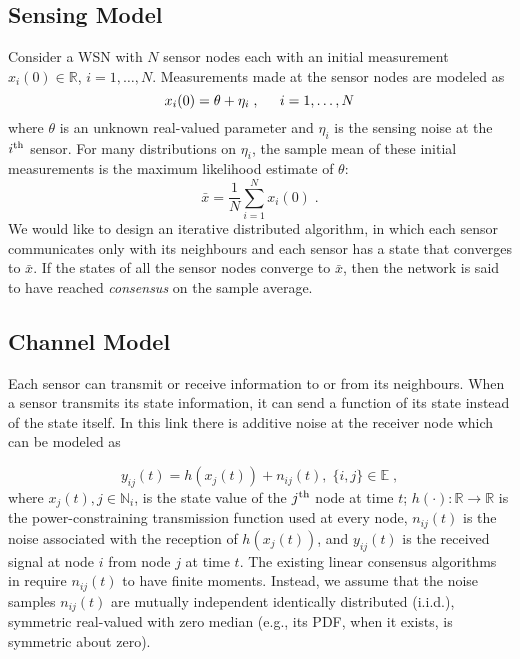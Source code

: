 \documentclass[onecolumn, draft, 12pt]{IEEEtran}
\newcommand{\Ni}{\mathbb{N}_{i}}
\newcommand{\R}{\mathbb{R}}
\newcommand{\xbar}{\bar{x}}
\begin{document}
\subsection{Sensing Model}\label{subsec:nld_sys_model_robust}
Consider a WSN with $N$ sensor nodes each with an initial measurement $x_i(0) \in \R$, $i = 1, \ldots, N$. Measurements made at the sensor nodes are modeled as
\begin{equation}\label{eqn:sensing_model_consensus_robust} x_i (0) = \theta + \eta_i  \;, \hspace{0.2 in} i = 1, \ldots, N
\end{equation}
where $\theta$ is an unknown real-valued parameter and $\eta_i$ is the sensing noise at the $i^{\rm th}$ sensor. For many distributions on $\eta_i$, the sample mean of these initial measurements is the maximum likelihood estimate of $\theta$:
\begin{equation}
\label{eq:sample_avg_robust}
\xbar= \frac{1}{N} \displaystyle\sum_{i=1}^{N} x_{i}(0) \;.
\end{equation}
We would like to design an iterative distributed algorithm, in which each sensor communicates only with its neighbours and each sensor has a state that converges to $\xbar$. If the states of all the sensor nodes converge to  $\xbar$, then the network is said to have reached \emph{consensus} on the sample average.  

\subsection{Channel Model}\label{subsec:nld_chn_model_robust}

Each sensor can transmit or receive information to or from its neighbours. When a sensor transmits its state information, it can send a function of its state instead of the state itself. In this link there is additive noise at the receiver node which can be modeled as

\begin{equation}
\label{eq:nld_ch_noise_recvd_info}
y_{ij}(t) = h(x_{j}(t)) + n_{ij}(t) , \; \{i,j\} \in \mathbb{E} \;,
\end{equation}
where $x_{j}(t), j \in \Ni$, is the state value of the $j^{\rm th}$ node at time $t$;  $h(\cdot): \R \rightarrow \R$ is the power-constraining transmission function used at every node, $n_{ij}(t)$ is the noise associated with the reception of $h(x_{j}(t))$, and $y_{ij}(t)$ is the received signal at node $i$ from node $j$ at time $t$. The existing linear consensus algorithms in \cite{Boyd2007,Touri2009,MinyiHuang2007,Pescosolido2008,Barbarossa2008,MinyiHuang2008,AysalBarner2010,Nedic2011cvx, KarMoura2009,KarMoura2007} require $n_{ij}(t)$ to have finite moments. Instead, we assume that the noise samples $n_{ij}(t)$ are mutually independent identically distributed (i.i.d.), symmetric real-valued with zero median (e.g., its PDF, when it exists, is symmetric about zero).
\end{document}
